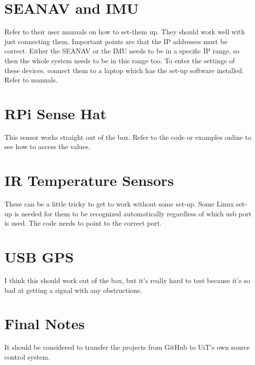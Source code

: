 \documentclass{article}
\begin{document}
\section{SEANAV and IMU}
Refer to their user manuals on how to set-them up.
They should work well with just connecting them. Important points are that the IP addresses must be correct. Either the SEANAV or the IMU needs to be in a specific IP range, so then the whole system needs to be in this range too.
To enter the settings of these devices, connect them to a laptop which has the set-up software installed. Refer to manuals.

\section{RPi Sense Hat}
This sensor works straight out of the box. Refer to the code or examples online to see how to access the values.

\section{IR Temperature Sensors}
These can be a little tricky to get to work without some set-up. Some Linux set-up is needed for them to be recognized automatically regardless of which usb port is used. The code needs to point to the correct port.

\section{USB GPS}
I think this should work out of the box,
but it’s really hard to test because it’s so bad at getting a signal with any obstructions.

\section{Final Notes}
It should be considered to transfer the projects from GitHub to UiT’s own source control system.
\end{document}
